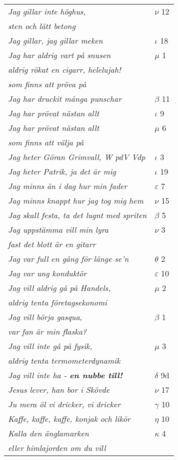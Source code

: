 \documentclass[a6paper,10pt]{article}
\begin{document}
\newpage
\setlength{\oddsidemargin}{-0.37in}
\begin{table}[!h]
\begin{tabular}{l l}
\textit{Jag gillar inte höghus,}	&$\nu$ 12\\
\textit{sten och lätt betong} &\\
\textit{Jag gillar, jag gillar meken} &$\iota$ 18\\
\textit{Jag har aldrig vart på snusen}	&$\mu$ 1\\
\textit{aldrig rökat en cigarr, helelujah!} &\\
\textit{som finns att pröva på} &\\
\textit{Jag har druckit många punschar}	&$\beta$ 11\\
\textit{Jag har prövat nästan allt}	&$\iota$ 9\\
\textit{Jag har prövat nästan allt }	&$\mu$ 6\\
\textit{som finns att välja på} &\\
\textit{Jag heter Göran Grimvall, W pdV Vdp}	&$\iota$ 3\\
\textit{Jag heter Patrik, ja det är mig}&$\iota$ 19\\
\textit{Jag minns än i dag hur min fader}	&$\varepsilon$ 7\\
\textit{Jag minns knappt hur jag tog mig hem}	&$\nu$ 15\\
\textit{Jag skall festa, ta det lugnt med spriten}	&$\beta$ 5\\
\textit{Jag uppstämma vill min lyra}	&$\nu$ 3\\
\textit{fast det blott är en gitarr} &\\
\textit{Jag var full en gång för länge se'n}	&$\theta$ 2\\
\textit{Jag var ung konduktör}	&$\varepsilon$ 10\\
\textit{Jag vill aldrig gå på Handels,}	&$\mu$ 2\\
\textit{aldrig tenta företagsekonomi} &\\
\textit{Jag vill börja gasqua,}	&$\beta$ 1\\
\textit{var fan är min flaska?} &\\
\textit{Jag vill inte gå på fysik,}	&$\mu$ 3\\
\textit{aldrig tenta termometerdynamik} &\\
\textit{Jag vill inte ha - \textbf{en nubbe till!}}	&$\delta$ 9d\\
\textit{Jesus lever, han bor i Skövde} &$\nu$ 17\\
\textit{Ju mera öl vi dricker, vi dricker}	&$\gamma$ 10\\
\textit{Kaffe, kaffe, kaffe, konjak och likör}	&$\eta$ 10\\
\textit{Kalla den änglamarken}	&$\kappa$ 4\\
\textit{eller himlajorden om du vill} &\\
\end{tabular}
\end{table}
\end{document}
